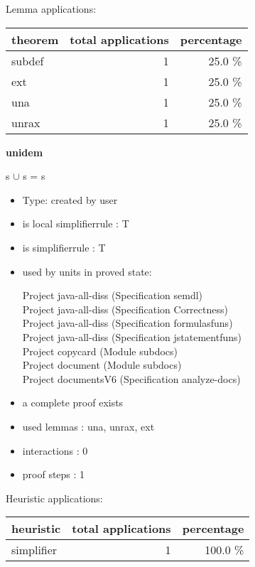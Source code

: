 \documentclass[a4paper]{article}
\begin{document}
Lemma applications:

\begin{supertabular}{l|r|r}
theorem	        & total applications & percentage \\ \hline
subdef & 1 & 25.0 \% \\
ext & 1 & 25.0 \% \\
una & 1 & 25.0 \% \\
unrax & 1 & 25.0 \% \\

\end{supertabular}
\pagebreak

{\LARGE\bf unidem}\label{lemma-unidem}

\medskip

 \Fol s $\cup$ s = s

\begin{itemize}

\item Type: created by user

\item is local simplifierrule : T
\item is simplifierrule : T
\item used by units in proved state:

Project java-all-diss (Specification semdl) \\
Project java-all-diss (Specification Correctness) \\
Project java-all-diss (Specification formulasfuns) \\
Project java-all-diss (Specification jstatementfuns) \\
Project copycard (Module subdocs) \\
Project document (Module subdocs) \\
Project documentsV6 (Specification analyze-docs)
\item       a complete proof exists
\item       used lemmas  : una, unrax, ext
\item       interactions : 0
\item       proof steps  : 1
\end{itemize}

\medskip


Heuristic applications:

\begin{supertabular}{l|r|r}
heuristic	& total applications & percentage \\ \hline
simplifier & 1 & 100.0 \% \\

\end{supertabular}
\end{document}
